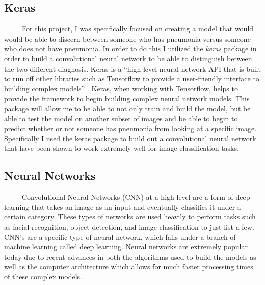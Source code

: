 \documentclass[12pt]{article}
\begin{document}
\hypertarget{keras}{%
\subsection{Keras}\label{keras}}

~~~~~For this project, I was specifically focused on creating a model
that would would be able to discern between someone who has pneumonia
versus someone who does not have pneumonia. In order to do this I
utilized the \emph{keras} package in order to build a convolutional
neural network to be able to distinguish between the two different
diagnosis. Keras is a ``high-level neural network API that is built to
run off other libraries such as Tensorflow to provide a user-friendly
interface to building complex models'' \citet{PML}. Keras, when working
with Tensorflow, helps to provide the framework to begin building
complex neural network models. This package will allow me to be able to
not only train and build the model, but be able to test the model on
another subset of images and be able to begin to predict whether or not
someone has pneumonia from looking at a specific image. Specifically I
used the keras package to build out a convolutional neural network that
have been shown to work extremely well for image classification tasks.

\hypertarget{neural-networks}{%
\subsection{Neural Networks}\label{neural-networks}}

~~~~~Convolutional Neural Networks (CNN) at a high level are a form of
deep learning that takes an image as an input and eventually classifies
it under a certain category. These types of networks are used heavily to
perform tasks such as facial recognition, object detection, and image
classification to just list a few. CNN's are a specific type of neural
network, which falls under a branch of machine learning called deep
learning. Neural networks are extremely popular today due to recent
advances in both the algorithms used to build the models as well as the
computer architecture which allows for much faster processing times of
these complex models.
\end{document}
